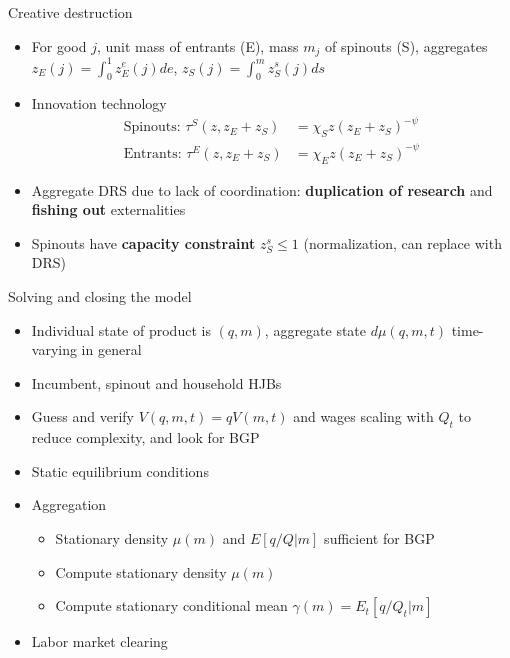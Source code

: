 \documentclass[english,usenames,dvipsnames]{beamer}
\begin{document}
\begin{frame}{Creative destruction}
\begin{itemize}
	\item For good $j$, unit mass of entrants (E), mass $m_j$ of spinouts (S), aggregates $z_E(j) = \int_0^1 z_E^e(j) de$, $z_S(j) = \int_0^{m} z_S^s(j) ds$
	\item Innovation technology
	\begin{align*}
	\textrm{Spinouts: }\tau^S(z,z_E+z_S) &= \chi_{S} z (z_E + z_S)^{-\psi} \\
	\textrm{Entrants: }\tau^E(z,z_E+z_S) &= \chi_{E} z (z_E + z_S)^{-\psi}
	\end{align*}
	\item Aggregate DRS due to lack of coordination: \textbf{\alert{duplication of research}} and \textbf{\alert{fishing out}} externalities
	\item Spinouts have \textbf{\alert{capacity constraint}} $z_S^s \le 1$ (normalization, can replace with DRS)
\end{itemize}
\end{frame}

\begin{frame}{Solving and closing the model}\label{closing_the_model}
\begin{itemize}
	\item Individual state of product is $(q,m)$, aggregate state $d\mu(q,m,t)$ time-varying in general 
	\item Incumbent, spinout and household HJBs \hyperlink{HJB_incumbent}{} \hyperlink{HJB_spinout}{} \hyperlink{HJB_household}{}
	\item Guess and verify $V(q,m,t) = qV(m,t)$ and wages scaling with $Q_t$ to reduce complexity, and look for BGP \hyperlink{scaling_of_value_functions}{}
	\item Static equilibrium conditions \hyperlink{static_eq_conditions}{}
	\item Aggregation 
	\begin{itemize}
		\item Stationary density $\mu(m)$ and $E[q/Q|m]$ sufficient for BGP \hyperlink{aggregate_distribution_and_bgp}{}
		\item Compute stationary density $\mu(m)$  \hyperlink{aggregation}{}
		\item Compute stationary conditional mean $\gamma(m) = E_t[q/Q_t|m]$ \hyperlink{aggregation}{}
	\end{itemize}
	\item Labor market clearing
\end{itemize}
\end{frame}
\end{document}

